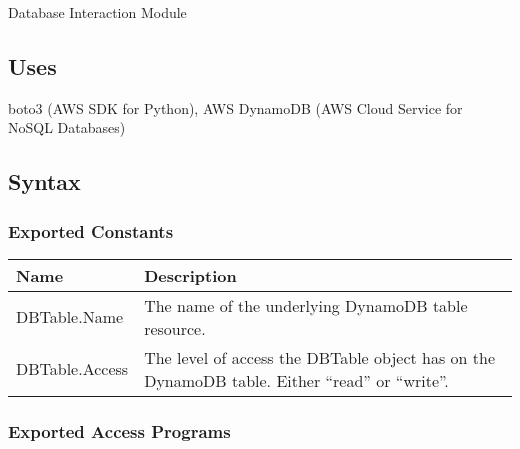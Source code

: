 \documentclass[12pt, titlepage]{article}
\begin{document}
Database Interaction Module

\subsection{Uses}

boto3 (AWS SDK for Python), AWS DynamoDB (AWS Cloud Service for NoSQL Databases)

\subsection{Syntax}

\subsubsection{Exported Constants}

\begin{center}
  \begin{tabular}{p{4cm} p{12cm}}
    \hline
    \textbf{Name} & \textbf{Description} \\
    \hline
    DBTable.Name & The name of the underlying DynamoDB table resource. \\
    \hline
    DBTable.Access & The level of access the DBTable object has on
    the DynamoDB table. Either ``read'' or ``write''. \\
    \hline
  \end{tabular}
\end{center}

\subsubsection{Exported Access Programs}
\end{document}
